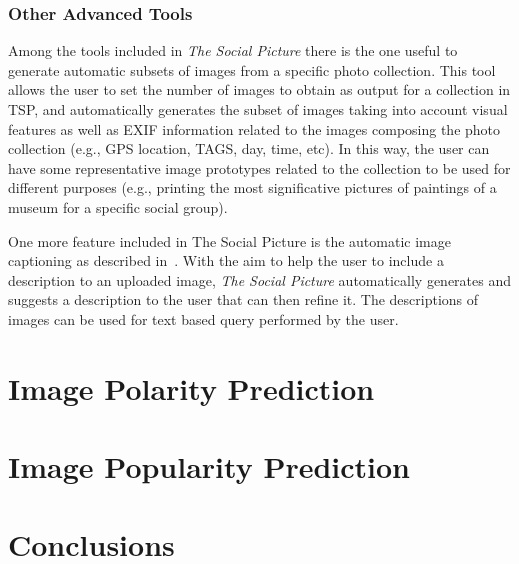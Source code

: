 \subsubsection{Other Advanced Tools}
%
Among the tools included in \textit{The Social Picture} there is the one useful to generate automatic subsets of images from a specific photo collection. This tool allows the user to set the number of images to obtain as output for a collection in TSP, and automatically generates the subset of images taking into account visual features as well as EXIF information related to the images composing the photo collection (e.g., GPS location, TAGS, day, time, etc). In this way, the user can have some representative image prototypes related to the collection to be used for different purposes (e.g., printing the most significative pictures of paintings of a museum for a specific social group).

One more feature included in The Social Picture is the automatic image captioning as described in~\cite{johnson2015densecap}. With the aim to help the user to include a description to an uploaded image, \textit{The Social Picture} automatically generates and suggests a description to the user that can then refine it.  The descriptions of images can be used for text based query performed by the user.


\section{Image Polarity Prediction}

\section{Image Popularity Prediction}

\section{Conclusions}